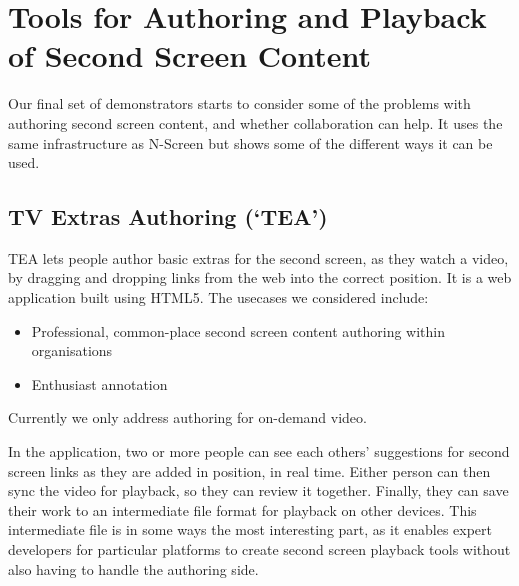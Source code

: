 \documentclass{notube}
\begin{document}
\section{Tools for Authoring and Playback of Second Screen Content}

Our final set of demonstrators starts to consider some of the problems with authoring second screen content, and whether collaboration can help. It uses the same infrastructure as N-Screen but shows some of the different ways it can be used.

\subsection{TV Extras Authoring (`TEA')}

TEA lets people author basic extras for the second screen, as they watch a video, by dragging and dropping links from the web into the correct position. It is a web application built using HTML5. The usecases we considered include:

\begin{itemize}
\item{Professional, common-place second screen content authoring within organisations}
\item{Enthusiast annotation}
\end{itemize}

Currently we only address authoring for on-demand video. 

In the application, two or more people can see each others' suggestions for second screen links as they are added in position, in real time. Either person can then sync the video for playback, so they can review it together. Finally, they can save their work to an intermediate file format for playback on other devices. This intermediate file is in some ways the most interesting part, as it enables expert developers for particular platforms to create second screen playback tools without also having to handle the authoring side.
\end{document}
